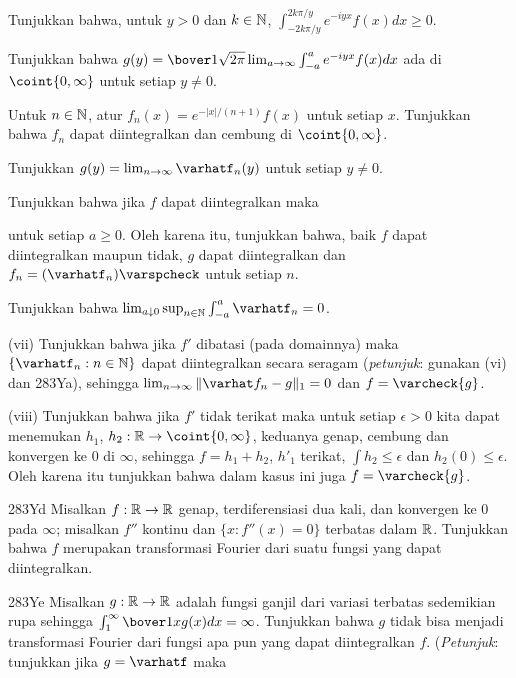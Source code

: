 { Tunjukkan bahwa, untuk $y>0$ dan $k\in\Bbb N$,
$\int_{-2k\pi/y}^{2k\pi/y}e^{-iyx}f(x)dx\ge 0$.

 Tunjukkan bahwa
$g(y)=\bover1{\sqrt{2\pi}}\lim_{a\to\infty}\int_{-a}^ae^{-iyx}f(x)dx$
ada di $\coint{0,\infty}$ untuk setiap $y\ne 0$.

 Untuk $n\in\Bbb N$, atur $f_n(x)
=e^{-|x|/(n+1)}f(x)$ untuk setiap $x$.   Tunjukkan bahwa $f_n$ dapat diintegralkan dan
cembung di $\coint{0,\infty}$.

 Tunjukkan $g(y)=\lim_{n\to\infty}\varhatf_{n}(y)$ untuk
setiap $y\ne 0$.

 Tunjukkan bahwa jika $f$ dapat diintegralkan maka


\noindent untuk setiap $a\ge 0$.   Oleh karena itu, tunjukkan bahwa, baik $f$
dapat diintegralkan maupun tidak, $g$ dapat diintegralkan dan
$f_n=(\varhatf_n)\varspcheck$ untuk setiap $n$.

 Tunjukkan bahwa
$\lim_{a\downarrow 0}\sup_{n\in\Bbb N}\int_{-a}^a\varhatf_n=0$.

\quad(vii) Tunjukkan bahwa jika $f'$ dibatasi (pada domainnya) maka
$\{\varhatf_n:n\in\Bbb N\}$ dapat diintegralkan secara seragam ({\it petunjuk\/}: gunakan
(vi) dan 283Ya), sehingga $\lim_{n\to\infty}\|\varhat f_n-g\|_1=0$ dan
$f=\varcheck{g}$.

\quad(viii) Tunjukkan bahwa jika $f'$ tidak terikat maka untuk setiap $\epsilon>0$ kita
dapat menemukan $h_1$, $h_2:\Bbb R\to\coint{0,\infty}$, keduanya genap, cembung dan
konvergen ke $0$ di $\infty$, sehingga $f=h_1+h_2$, $h'_1$ terikat,
$\int h_2\le\epsilon$ dan $h_2(0)\le\epsilon$.   Oleh karena itu tunjukkan bahwa dalam kasus
ini juga $f=\varcheck{g}$.

\spheader 283Yd Misalkan $f:\Bbb R\to\Bbb R$ genap, terdiferensiasi dua
kali, dan konvergen ke $0$ pada $\infty$; misalkan $f''$ kontinu dan
$\{x:f''(x)=0\}$ terbatas dalam $\Bbb R$. Tunjukkan bahwa $f$ merupakan
transformasi Fourier dari suatu fungsi yang dapat diintegralkan.

\spheader 283Ye Misalkan $g:\Bbb R\to\Bbb R$ adalah fungsi ganjil dari variasi terbatas
sedemikian rupa sehingga $\int_1^{\infty}\bover1xg(x)dx=\infty$.
Tunjukkan bahwa $g$ tidak bisa menjadi transformasi Fourier dari fungsi apa pun yang dapat diintegralkan
$f$.   ({\it Petunjuk\/}: tunjukkan jika $g=\varhatf$ maka

}%

